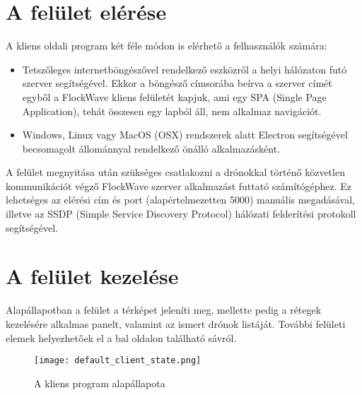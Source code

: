 \section{A felület elérése}

A kliens oldali program két féle módon is elérhető a felhasználók számára:
\begin{itemize}
  \item Tetszőleges internetböngészővel rendelkező eszközről a helyi hálózaton
  futó szerver segítségével. Ekkor a böngésző címsorába beírva a szerver címét
  egyből a FlockWave kliens felületét kapjuk, ami egy SPA (Single Page
  Application), tehát összesen egy lapból áll, nem alkalmaz navigációt.
  \item Windows, Linux vagy MacOS (OSX) rendszerek alatt Electron segítségével
  becsomagolt állománnyal rendelkező önálló alkalmazásként.
\end{itemize}

A felület megnyitása után szükséges csatlakozni a drónokkal történő közvetlen
kommunikációt végző FlockWave szerver alkalmazást futtató számítógéphez. Ez
lehetséges az elérési cím és port (alapértelmezetten 5000) manuális megadásával,
illetve az SSDP (Simple Service Discovery Protocol) hálózati felderítési
protokoll segítségével.

\section{A felület kezelése}

Alapállapotban a felület a térképet jeleníti meg, mellette pedig a rétegek
kezelésére alkalmas panelt, valamint az ismert drónok listáját. További felületi
elemek helyezhetőek el a bal oldalon található sávról.

\begin{figure}[h!]
  \center
  \texttt{[image: default\_client\_state.png]}
  \caption{A kliens program alapállapota}
  \label{fig:default_client_state}
\end{figure}


